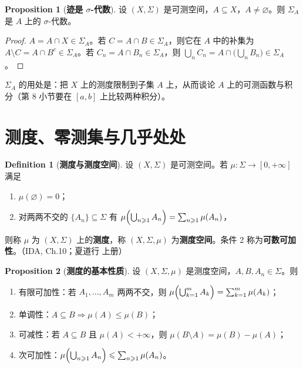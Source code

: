 \documentclass[oneside]{book}
\theoremstyle{definition}
\theoremstyle{definition}
\newtheorem{proposition}{Proposition}[section]
\newtheorem{definition}{Definition}[section]
\begin{document}
	\begin{proposition}[\bfseries{迹是 $\sigma$-代数}]
		设 $(X,\Sigma)$ 是可测空间，$A\subseteq X$，$A\neq\varnothing$。则 $\Sigma_A$ 是 $A$ 上的 $\sigma$-代数。
	\end{proposition}
	
	\begin{proof}
		$A=A\cap X\in\Sigma_A$。若 $C=A\cap B\in\Sigma_A$，则它在 $A$ 中的补集为 $A\setminus C=A\cap B^{c}\in\Sigma_A$。若 $C_n=A\cap B_n\in\Sigma_A$，则 $\bigcup_n C_n=A\cap\bigl(\bigcup_n B_n\bigr)\in\Sigma_A$。
	\end{proof}
	
	$\Sigma_A$ 的用处是：把 $X$ 上的测度限制到子集 $A$ 上，从而谈论 $A$ 上的可测函数与积分（第 8 小节要在 $[a,b]$ 上比较两种积分）。
	
	\section{测度、零测集与几乎处处}
	
	\begin{definition}[\bfseries{测度与测度空间}]
		设 $(X,\Sigma)$ 是可测空间。若 $\mu:\Sigma\to[0,+\infty]$ 满足
		\begin{enumerate}
			\item $\mu(\varnothing)=0$；
			\item 对两两不交的 $\{A_n\}\subseteq\Sigma$ 有 $\mu\Bigl(\bigcup_{n\geqslant1}A_n\Bigr)=\sum_{n\geqslant1}\mu(A_n)$，
		\end{enumerate}
		则称 $\mu$ 为 $(X,\Sigma)$ 上的\textbf{测度}，称 $(X,\Sigma,\mu)$ 为\textbf{测度空间}。条件 2 称为\textbf{可数可加性}。（IDA, Ch.10；夏道行 上册）
	\end{definition}
	
	\begin{proposition}[\bfseries{测度的基本性质}]
		设 $(X,\Sigma,\mu)$ 是测度空间，$A,B,A_n\in\Sigma$。则
		\begin{enumerate}
			\item 有限可加性：若 $A_1,\dots,A_m$ 两两不交，则 $\mu\Bigl(\bigcup_{k=1}^{m}A_k\Bigr)=\sum_{k=1}^{m}\mu(A_k)$；
			\item 单调性：$A\subseteq B\Rightarrow\mu(A)\leqslant\mu(B)$；
			\item 可减性：若 $A\subseteq B$ 且 $\mu(A)<+\infty$，则 $\mu(B\setminus A)=\mu(B)-\mu(A)$；
			\item 次可加性：$\mu\Bigl(\bigcup_{n\geqslant1}A_n\Bigr)\leqslant\sum_{n\geqslant1}\mu(A_n)$。
		\end{enumerate}
	\end{proposition}
	
\end{document}

